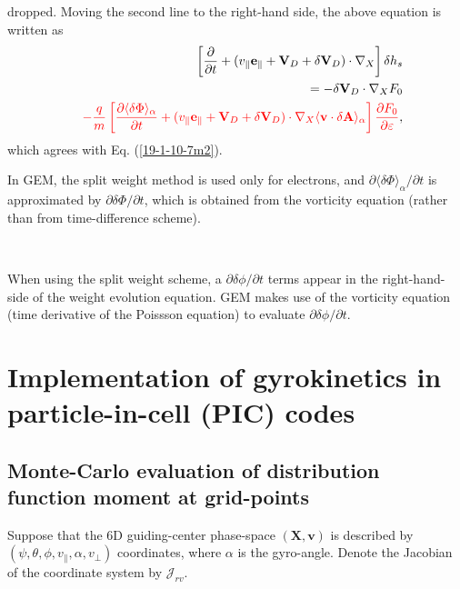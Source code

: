 \documentclass{article}
\newcommand{\tmcolor}[2]{{\color{#1}{#2}}}
\begin{document}
dropped. Moving the second line to the right-hand side, the above equation is
written as
\begin{eqnarray}
  &  & \left[ \frac{\partial}{\partial t} + (v_{\parallel}
  \mathbf{e}_{\parallel} +\mathbf{V}_D + \delta \mathbf{V}_D) \cdot \nabla_X
  \right] \delta h_s \nonumber\\
  &  & = - \delta \mathbf{V}_D \cdot \nabla_X F_0 \nonumber\\
  &  & \tmcolor{red}{- \frac{q}{m}  \left[ \frac{\partial \langle \delta \Phi
  \rangle_{\alpha}}{\partial t} + (v_{\parallel} \mathbf{e}_{\parallel}
  +\mathbf{V}_D + \delta \mathbf{V}_D) \cdot \nabla_X \langle \mathbf{v} \cdot
  \delta \mathbf{A} \rangle_{\alpha} \right] \frac{\partial F_0}{\partial
  \varepsilon}},  \label{19-1-10-e2}
\end{eqnarray}
which agrees with Eq. (\ref{19-1-10-7m2}).

In GEM, the split weight method is used only for electrons, and $\partial
\langle \delta \Phi \rangle_{\alpha} / \partial t$ is approximated by
$\partial \delta \Phi / \partial t$, which is obtained from the vorticity
equation (rather than from time-difference scheme).

\

When using the split weight scheme, a $\partial \delta \phi / \partial t$
terms appear in the right-hand-side of the weight evolution equation. GEM
makes use of the vorticity equation (time derivative of the Poissson equation)
to evaluate $\partial \delta \phi / \partial t$.

\section{Implementation of gyrokinetics in particle-in-cell (PIC) codes}

\subsection{Monte-Carlo evaluation of distribution function moment at
grid-points}

Suppose that the 6D guiding-center phase-space $(\mathbf{X}, \mathbf{v})$ is
described by $(\psi, \theta, \phi, v_{\parallel}, \alpha, v_{\perp})$
coordinates, where $\alpha$ is the gyro-angle. Denote the Jacobian of the
coordinate system by $\mathcal{J}_{r v} \mathcal{}$.
\end{document}
